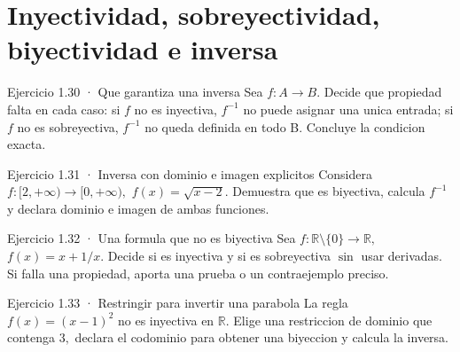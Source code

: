 \documentclass[10pt,a4paper,oneside,openany]{book}
\begin{document}
\section{Inyectividad, sobreyectividad, biyectividad e inversa}
\begin{PSevenExerciseFixed}{Ejercicio 1.30 · Que garantiza una inversa}
Sea \(f:A\to B\). Decide que propiedad falta en cada caso: si \(f\) no es inyectiva, \(f^{-1}\) no puede asignar una unica entrada; si \(f\) no es sobreyectiva, \(f^{-1}\) no queda definida en todo B. Concluye la condicion exacta.
\end{PSevenExerciseFixed}
\begin{PSevenExerciseFixed}{Ejercicio 1.31 · Inversa con dominio e imagen explicitos}
Considera \(f:[2,+\infty )\to [0,+\infty ),\) \(f(x)=\sqrt{x-2}\). Demuestra que es biyectiva, calcula \(f^{-1}\) y declara dominio e imagen de ambas funciones.
\end{PSevenExerciseFixed}
\begin{PSevenExerciseFixed}{Ejercicio 1.32 · Una formula que no es biyectiva}
Sea \(f:\mathbb{R}\setminus \{0\}\to \mathbb{R},\) \(f(x)=x+1/x\). Decide si es inyectiva y si es sobreyectiva \(\sin\) usar derivadas. Si falla una propiedad, aporta una prueba o un contraejemplo preciso.
\end{PSevenExerciseFixed}
\begin{PSevenExerciseFixed}{Ejercicio 1.33 · Restringir para invertir una parabola}
La regla \(f(x)=(x-1)^{2}\) no es inyectiva en \(\mathbb{R}\). Elige una restriccion de dominio que contenga \(3,\) declara el codominio para obtener una biyeccion y calcula la inversa.
\end{PSevenExerciseFixed}
\end{document}
